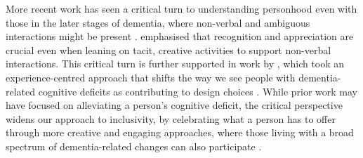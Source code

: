 More recent work has seen a critical turn to understanding personhood even with those in the later stages of dementia, where non-verbal and ambiguous interactions might be present \citep{lazar_critical_2017}. \cite{treadaway_sensor_2016} emphasised that recognition and appreciation are crucial even when leaning on tacit, creative activities to support non-verbal interactions. This critical turn is further supported in work by \cite{morrissey_value_2017}, which took an experience-centred approach that shifts the way we see people with dementia-related cognitive deficits as contributing to design choices \citep{wright_aesthetics_2008}. While prior work may have focused on alleviating a person's cognitive deficit, the critical perspective widens our approach to inclusivity, by celebrating what a person has to offer through more creative and engaging approaches, where those living with a broad spectrum of dementia-related changes can also participate \citep{foley_printer_2019}.

